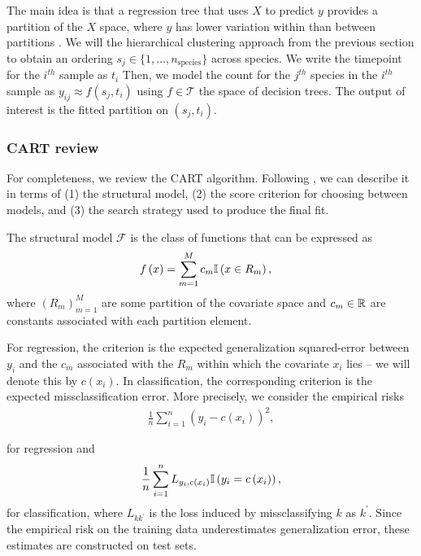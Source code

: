 \documentclass{article}
\begin{document}
The main idea is that a regression tree that uses $X$ to predict $y$ provides a
partition of the $X$ space, where $y$ has lower variation within than between
partitions \citep{breiman1984classification}. We will the hierarchical
clustering approach from the previous section to obtain an ordering $s_{j} \in
\{1, \dots, n_{\text{species}}\}$ across species. We write the timepoint for the
$i^{th}$ sample as $t_{i}$ Then, we model the count for the $j^{th}$ species in
the $i^{th}$ sample as $y_{ij} \approx f\left(s_{j}, t_{i}\right)$ using
$f \in \mathcal{T}$ the space of decision trees. The output of interest is the
fitted partition on $\left(s_{j}, t_{i}\right)$.

\subsubsection{CART review}
\label{subsubsec:cart_review}

For completeness, we review the CART algorithm. Following \citep{stat315bnotes},
we can describe it in terms of (1) the structural model, (2) the score criterion
for choosing between models, and (3) the search strategy used to produce the
final fit.

The structural model $\mathcal{F}$ is the class of functions that can be
expressed as
\begin{align*}
f\left(x\right) &= \sum_{m = 1}^{M} c_{m} \mathbb{I}\left({x \in R_{m}}\right),
\end{align*}
where $\left(R_{m}\right)_{m = 1}^{M}$ are some partition of the covariate space
and $c_{m} \in \mathbb{R}$ are constants associated with each partition element.

For regression, the criterion is the expected generalization squared-error
between $y_{i}$ and the $c_{m}$ associated with the $R_{m}$ within which the
covariate $x_{i}$ lies -- we will denote this by $c\left(x_{i}\right)$. In
classification, the corresponding criterion is the expected missclassification
error. More precisely, we consider the empirical risks
\begin{align*}
  \frac{1}{n} \sum_{i = 1}^{n} \left(y_{i} - c\left(x_{i}\right)\right)^{2},
\end{align*}

for regression and
\begin{align*}
  \frac{1}{n} \sum_{i = 1}^{n} L_{y_{i}, c\left(x_{i}\right)} \mathbb{I}\left({y_{i} = c\left(x_{i}\right)}\right),
\end{align*}
for classification, where $L_{kk^{\prime}}$ is the loss induced by
missclassifying $k$ as $k^{\prime}$. Since the empirical risk on the training
data underestimates generalization error, these estimates are constructed on
test sets.
\end{document}
